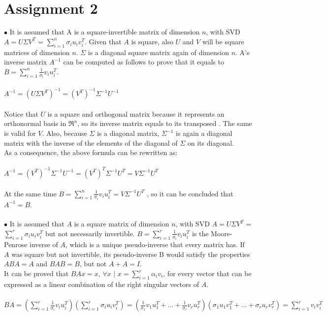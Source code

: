\documentclass[]{report}
\begin{document}
\section*{Assignment 2}
$\bullet$ It is assumed that A is a square-invertible matrix of dimension $n$, with SVD $A = U \Sigma V^T$ = $\sum_{i=1}^{n} \sigma_i u_i v_i^T$. Given that $A$ is square, also $U$ and $V$ will be square matrices of dimension $n$. $\Sigma$ is a diagonal square matrix again of dimension $n$. A's inverse matrix $A^{-1}$ can be computed as follows to prove that it equals to $B = \sum_{i=1}^{n} \frac{1}{\sigma_i} v_i u_i^T$.\\\\
$A^{-1} = (U \Sigma V^T)^{-1} = (V^T)^{-1} \Sigma^{-1} U^{-1}$\\\\
Notice that $U$ is a square and orthogonal matrix because it represents an orthonormal basis in $\Re^n$, so its inverse matrix equals to its transposed \cite{mat}. The same is valid for $V$. Also, because $\Sigma$ is a diagonal matrix, $\Sigma^{-1}$ is again a diagonal matrix with the inverse of the elements of the diagonal of $\Sigma$ on its diagonal.\\
As a consequence, the above formula can be rewritten as:\\\\
$A^{-1} = (V^T)^{-1} \Sigma^{-1} U^{-1} = (V^T)^{T} \Sigma^{-1} U^{T} = V \Sigma^{-1} U^{T} $ \\\\
At the same time $B = \sum_{i=1}^{n} \frac{1}{\sigma_i} v_i u_i^T = V \Sigma^{-1} U^{T}$ , so it can be concluded that $A^{-1} = B$.\\\\
$\bullet$ It is assumed that $A$ is a square matrix of dimension $n$, with SVD $A = U \Sigma V^T$ = $\sum_{i=1}^{r} \sigma_i u_i v_i^T$ but not necessarily invertible. $B = \sum_{i=1}^{r} \frac{1}{\sigma_i} v_i u_i^T$ is the Moore-Penrose inverse of $A$, which is a unique pseudo-inverse that every matrix has. If $A$ was square but not invertible, its pseudo-inverse B would satisfy the properties $ABA = A$ and $BAB = B$, but not $A+A = I$. \\
It can be proved that $BAx = x$, $ \forall x$ $|$ $x = \sum_{i=1}^{r} \alpha_i v_i$, for every vector that can be expressed as a linear combination of the right singular vectors of $A$.\\\\
$BA = (\sum_{i=1}^{r} \frac{1}{\sigma_i} v_i u_i^T)(\sum_{i=1}^{r} \sigma_i u_i v_i^T) = (\frac{1}{\sigma_1} v_1 u_1^T+...+\frac{1}{\sigma_r} v_r u_r^T)(\sigma_1 u_1 v_1^T+...+\sigma_r u_r v_r^T) = \sum_{i=1}^{r} v_i v_i^T$	\\\\
\end{document}
